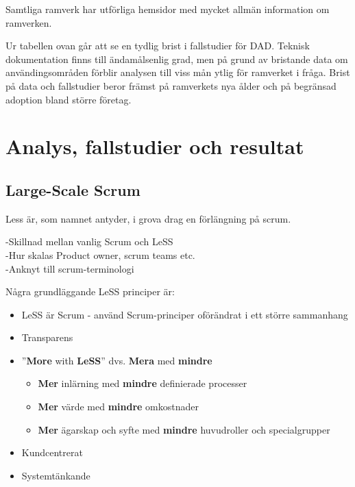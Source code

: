 		Samtliga ramverk har utförliga hemsidor med mycket allmän information om ramverken.
		
		Ur tabellen ovan går att se en tydlig brist i fallstudier för DAD. Teknisk dokumentation finns till ändamålsenlig grad, men på grund av bristande data om användingsområden förblir analysen till viss mån ytlig för ramverket i fråga.
		Brist på data och fallstudier beror främst på ramverkets nya ålder och på begränsad adoption bland större företag.
	
	
\newpage
\section{Analys, fallstudier och resultat}
	
	
	\subsection{Large-Scale Scrum}
	
	
		Less är, som namnet antyder, i grova drag en förlängning på scrum.
		
		
		-Skillnad mellan vanlig Scrum och LeSS \\
		-Hur skalas Product owner, scrum teams etc. \\
		-Anknyt till scrum-terminologi
	
		Några grundläggande LeSS principer är: \cite{less_principles}
	
		\begin{itemize}
			\setlength{\itemsep}{1pt}
			\item LeSS är Scrum - använd Scrum-principer oförändrat i ett större sammanhang			
			\item Transparens
			\item ''\textbf{More} with \textbf{LeSS}'' dvs. \textbf{Mera} med \textbf{mindre}
				\begin{itemize}
					\item \textbf{Mer} inlärning med \textbf{mindre} definierade processer
					\item \textbf{Mer} värde med \textbf{mindre} omkostnader
					\item \textbf{Mer} ägarskap och syfte med \textbf{mindre} huvudroller och specialgrupper
				\end{itemize}
			\item Kundcentrerat
			\item Systemtänkande
		\end{itemize}
			
